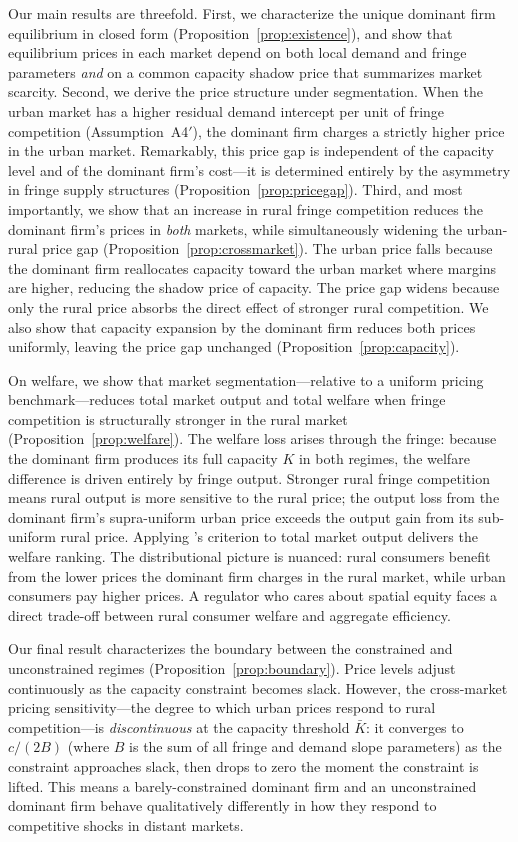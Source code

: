 \documentclass[12pt]{article}
\theoremstyle{plain}
\theoremstyle{definition}
\theoremstyle{remark}
\begin{document}
Our main results are threefold.  First, we characterize the unique
dominant firm equilibrium in closed form (Proposition~\ref{prop:existence}), and
show that equilibrium prices in each market depend on both local demand and fringe
parameters \emph{and} on a common capacity shadow price that summarizes market
scarcity.  Second, we derive the price structure under segmentation.  When the
urban market has a higher residual demand intercept per unit of fringe competition
(Assumption~A4$'$), the dominant firm charges a strictly higher price in the urban
market.  Remarkably, this price gap is independent of the capacity level and of
the dominant firm's cost---it is determined entirely by the asymmetry in fringe
supply structures (Proposition~\ref{prop:pricegap}).  Third, and most
importantly, we show that an increase in rural fringe competition reduces the
dominant firm's prices in \emph{both} markets, while simultaneously widening the
urban-rural price gap (Proposition~\ref{prop:crossmarket}).  The urban price
falls because the dominant firm reallocates capacity toward the urban market where
margins are higher, reducing the shadow price of capacity.  The price gap widens
because only the rural price absorbs the direct effect of stronger rural
competition.  We also show that capacity expansion by the dominant firm reduces
both prices uniformly, leaving the price gap unchanged
(Proposition~\ref{prop:capacity}).

On welfare, we show that market segmentation---relative to a uniform pricing
benchmark---reduces total market output and total welfare when fringe competition
is structurally stronger in the rural market (Proposition~\ref{prop:welfare}).
The welfare loss arises through the fringe: because the dominant firm produces
its full capacity $K$ in both regimes, the welfare difference is driven entirely
by fringe output.  Stronger rural fringe competition means rural output is more
sensitive to the rural price; the output loss from the dominant firm's supra-uniform
urban price exceeds the output gain from its sub-uniform rural price.  Applying
\citeauthor{Varian1985}'s criterion to total market output delivers the welfare
ranking.  The distributional picture is nuanced: rural consumers benefit from the
lower prices the dominant firm charges in the rural market, while urban consumers
pay higher prices.  A regulator who cares about spatial equity faces a direct
trade-off between rural consumer welfare and aggregate efficiency.

Our final result characterizes the boundary between the constrained and
unconstrained regimes (Proposition~\ref{prop:boundary}).  Price levels adjust
continuously as the capacity constraint becomes slack.  However, the cross-market
pricing sensitivity---the degree to which urban prices respond to rural
competition---is \emph{discontinuous} at the capacity threshold $\bar{K}$: it
converges to $c/(2B)$ (where $B$ is the sum of all fringe and demand slope
parameters) as the constraint approaches slack, then drops to zero the moment
the constraint is lifted.  This means a barely-constrained dominant firm and an
unconstrained dominant firm behave qualitatively differently in how they respond
to competitive shocks in distant markets.
\end{document}
